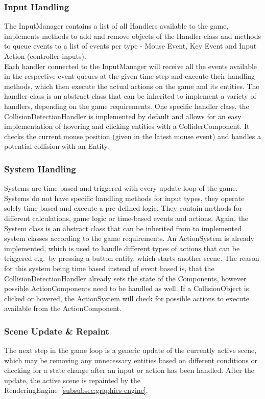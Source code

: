\subsubsection{Input Handling}\label{subsubsec:input-handling}
The InputManager contains a list of all Handlers available to the game, implements methods to add and remove objects of the Handler class and methods to queue events
to a list of events per type - Mouse Event, Key Event and Input Action (controller inputs).
\\
Each handler connected to the InputManager will receive all the events available in the respective event queues at the given time step and execute their handling methods, which
then execute the actual actions on the game and its entities.
The handler class is an abstract class that can be inherited to implement a variety of handlers, depending on the game requirements.
One specific handler class, the CollisionDetectionHandler is implemented by default and allows for an easy implementation of hovering and clicking entities with a ColliderComponent.
It checks the current mouse position (given in the latest mouse event) and handles a potential collision with an Entity.

\subsubsection{System Handling}\label{subsubsec:system-handling}
Systems are time-based and triggered with every update loop of the game.
Systems do not have specific handling methods for input types, they operate solely time-based and execute a pre-defined logic.
They contain methods for different calculations, game logic or time-based events and actions.
Again, the System class is an abstract class that can be inherited from to implemented system classes according to the game requirements.
An ActionSystem is already implemented, which is used to handle different types of actions that can be triggered e.g.\ by pressing a button entity, which starts
another scene.
The reason for this system being time based instead of event based is, that the CollisionDetectionHandler already sets the state of the Components,
however possible ActionComponents need to be handled as well.
If a CollisionObject is clicked or hovered, the ActionSystem will check for possible actions to execute available from the ActionComponent.

\subsubsection{Scene Update \& Repaint}\label{subsubsec:scene-update-&-repaint}
The next step in the game loop is a generic update of the currently active scene, which may be removing any unnecessary entities based on different conditions or
checking for a state change after an input or action has been handled.
After the update, the active scene is repainted by the RenderingEngine~\ref{subsubsec:graphics-engine}.


